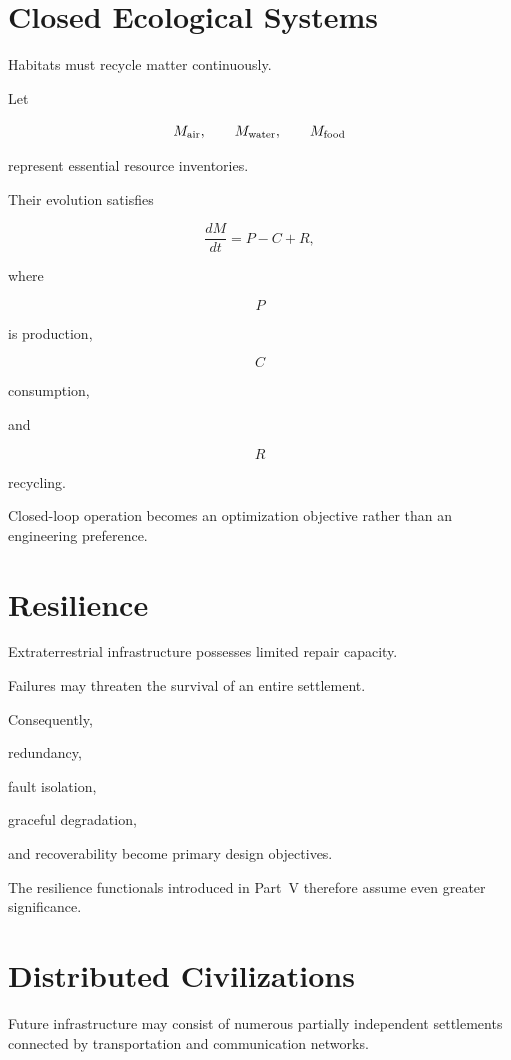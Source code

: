 \documentclass[11pt,fleqn]{book}
\numberwithin{equation}{chapter}
\theoremstyle{plain}
\theoremstyle{definition}
\theoremstyle{remark}
\begin{document}
\section{Closed Ecological Systems}

Habitats must recycle matter continuously.

Let

\[
M_{\rm air},
\qquad
M_{\rm water},
\qquad
M_{\rm food}
\]

represent essential resource inventories.

Their evolution satisfies

\[
\boxed{
\frac{dM}{dt}
=
P
-
C
+
R,
}
\]

where

\[
P
\]

is production,

\[
C
\]

consumption,

and

\[
R
\]

recycling.

Closed-loop operation becomes an optimization objective rather than an
engineering preference.


\section{Resilience}

Extraterrestrial infrastructure possesses limited repair capacity.

Failures may threaten the survival of an entire settlement.

Consequently,

redundancy,

fault isolation,

graceful degradation,

and recoverability become primary design objectives.

The resilience functionals introduced in Part~V therefore assume even
greater significance.


\section{Distributed Civilizations}

Future infrastructure may consist of numerous partially independent
settlements connected by transportation and communication networks.
\end{document}

